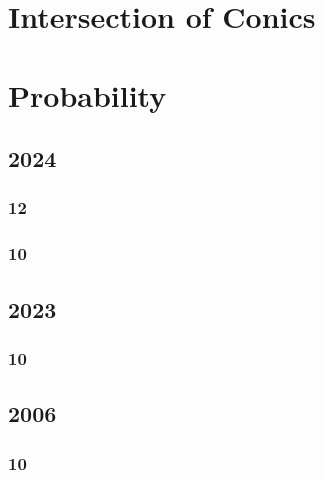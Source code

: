 \documentclass[11pt]{book}
\begin{document}
\chapter{Intersection of Conics}

%





\chapter{Probability}
\section{2024}
\subsection{12}

\subsection{10}

\section{2023}
\subsection{10}

\section{2006}
\subsection{10}

%
\end{document}
